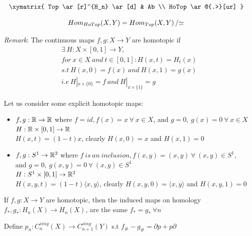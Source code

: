 \documentclass[11pt,a4paper]{report}
\begin{document}
	\[
		\xymatrix{
			Top  \ar[r]^{H_n} \ar[d]
			& Ab  \\
			HoTop \ar@{.>}[ur] }
	\]

	\[ {Hom}_{HoTop}(X, Y) = {Hom}_{Top}(X, Y) \left/ \simeq \right. \]

    \emph{Remark}: The continuous maps $f, g: X \rightarrow Y$ are homotopic if
    \begin{align*}
     &\exists \ H: X \times [0, 1] \rightarrow Y , \\
     &for \ x \in X \ and \ t \in [0, 1]: H(x, t) = H_t(x) \\
     &s.t \ H(x, 0) = f(x) \ and \ H(x, 1) = g(x) \\
     &i.e \ H|_{x \times \{0\}} = f \ and \ H|_{x \times \{1\}} = g
     \end{align*}

     Let us consider some explicit homotopic maps:

     \begin{itemize}
      \item $f, g: \mathbb{R} \rightarrow \mathbb{R}$ where $f = id, f(x) = x \ \forall \ x \in X$, and $g = 0, \ g(x) = 0 \ \forall \ x \in X$ \\
      $H: \mathbb{R} \times [0, 1] \rightarrow \mathbb{R}$ \\
      $H(x, t) = (1-t)x$, clearly $H(x, 0) = x$ and $H(x, 1) = 0$
      \item $f, g: S^1 \rightarrow \mathbb{R}^2$ where $f \ is \ an \ inclusion, f(x,y) = (x,y) \ \forall \ (x, y) \in S^1$, and $g = 0, \ g(x,y) = 0 \ \forall \ (x, y) \in S^1$ \\
      $H: S^1 \times [0, 1] \rightarrow \mathbb{R}^2$ \\
      $H(x, y, t) = (1-t)\langle x, y \rangle$, clearly $H(x, y, 0) = \langle x, y \rangle$ and $H(x, y, 1) = 0$
     \end{itemize}

     \label{homotopicSpaces}If $f, g: X \rightarrow Y$ are homotopic, then the induced maps on homology
     $f_*, g_*: H_n(X) \rightarrow H_n(X)$, are the same $f_* = g_* \ \forall{n}$

     Define $p_n: C_n^{sing}(X) \rightarrow C_{n+1}^{sing}(Y) $ s.t $f_\# - g_\# = \partial p + p\partial$ \\
\end{document}
